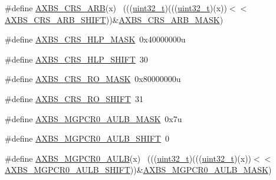\begin{DoxyCompactItemize}
\item 
\#define \hyperlink{group___a_x_b_s___register___masks_ga431c09a03395c796da286f1642490e86}{A\+X\+B\+S\+\_\+\+C\+R\+S\+\_\+\+A\+RB}(x)                                                ~(((\hyperlink{_p_e___types_8h_a33594304e786b158f3fb30289278f5af}{uint32\+\_\+t})(((\hyperlink{_p_e___types_8h_a33594304e786b158f3fb30289278f5af}{uint32\+\_\+t})(x))$<$$<$\hyperlink{group___a_x_b_s___register___masks_ga1b37d1aff0c53735798f6de4ead2cf16}{A\+X\+B\+S\+\_\+\+C\+R\+S\+\_\+\+A\+R\+B\+\_\+\+S\+H\+I\+FT}))\&\hyperlink{group___a_x_b_s___register___masks_ga18bef8f761d00bf46b543a96adb7eae3}{A\+X\+B\+S\+\_\+\+C\+R\+S\+\_\+\+A\+R\+B\+\_\+\+M\+A\+SK})
\item 
\#define \hyperlink{group___a_x_b_s___register___masks_gab93f8320945abd915c31020d4d147d33}{A\+X\+B\+S\+\_\+\+C\+R\+S\+\_\+\+H\+L\+P\+\_\+\+M\+A\+SK}~0x40000000u
\item 
\#define \hyperlink{group___a_x_b_s___register___masks_ga6cf361c996f63fd5cc169c352971bcd2}{A\+X\+B\+S\+\_\+\+C\+R\+S\+\_\+\+H\+L\+P\+\_\+\+S\+H\+I\+FT}~30
\item 
\#define \hyperlink{group___a_x_b_s___register___masks_gac511a1f4f6590cd86da388390b2993b5}{A\+X\+B\+S\+\_\+\+C\+R\+S\+\_\+\+R\+O\+\_\+\+M\+A\+SK}~0x80000000u
\item 
\#define \hyperlink{group___a_x_b_s___register___masks_ga51572e77d4fe6c519be097a8e6324331}{A\+X\+B\+S\+\_\+\+C\+R\+S\+\_\+\+R\+O\+\_\+\+S\+H\+I\+FT}~31
\item 
\#define \hyperlink{group___a_x_b_s___register___masks_ga161e38235a1d3154067e078e559202fd}{A\+X\+B\+S\+\_\+\+M\+G\+P\+C\+R0\+\_\+\+A\+U\+L\+B\+\_\+\+M\+A\+SK}~0x7u
\item 
\#define \hyperlink{group___a_x_b_s___register___masks_ga2c00c30d63906c765a6df81778e2fb4f}{A\+X\+B\+S\+\_\+\+M\+G\+P\+C\+R0\+\_\+\+A\+U\+L\+B\+\_\+\+S\+H\+I\+FT}~0
\item 
\#define \hyperlink{group___a_x_b_s___register___masks_ga934e66d76e8d9cf8177705cadff67976}{A\+X\+B\+S\+\_\+\+M\+G\+P\+C\+R0\+\_\+\+A\+U\+LB}(x)                                        ~(((\hyperlink{_p_e___types_8h_a33594304e786b158f3fb30289278f5af}{uint32\+\_\+t})(((\hyperlink{_p_e___types_8h_a33594304e786b158f3fb30289278f5af}{uint32\+\_\+t})(x))$<$$<$\hyperlink{group___a_x_b_s___register___masks_ga2c00c30d63906c765a6df81778e2fb4f}{A\+X\+B\+S\+\_\+\+M\+G\+P\+C\+R0\+\_\+\+A\+U\+L\+B\+\_\+\+S\+H\+I\+FT}))\&\hyperlink{group___a_x_b_s___register___masks_ga161e38235a1d3154067e078e559202fd}{A\+X\+B\+S\+\_\+\+M\+G\+P\+C\+R0\+\_\+\+A\+U\+L\+B\+\_\+\+M\+A\+SK})

\end{DoxyCompactItemize}
